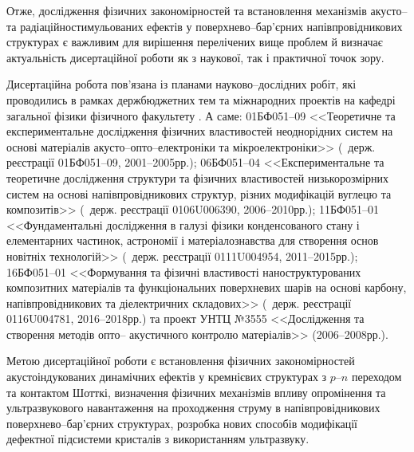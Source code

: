 Отже,  дослідження фізичних  закономірностей  та встановлення механізмів акусто-- та радіаційностимульованих
ефектів у поверхнево--бар'єрних напівпровідникових структурах  є  важливим  для  вирішення  перелічених  вище  проблем  й визначає актуальність дисертаційної роботи як з наукової, так і практичної точок зору.


{\InterconnectionTXT}
Дисертаційна робота  пов’язана із планами науково--дослідних робіт, які проводились в рамках
держбюджетних тем та міжнародних проектів на кафедрі загальної фізики фізичного факультету \thesisOfOrganization.
А саме:
\textnumero01БФ051--09 <<Теоретичне та експериментальне дослідження фізичних властивостей неоднорідних систем на основі матеріалів акусто--опто--електроніки та мікроелектроніки>>
(\textnumero~держ. реєстрації 01БФ051--09, 2001--2005рр.);
\textnumero06БФ051--04 <<Експериментальне та теоретичне дослідження структури та фізичних властивостей низькорозмірних систем на основі напівпровідникових структур, різних модифікацій вуглецю та композитів>>
(\textnumero~держ. реєстрації 0106U006390, 2006--2010рр.);
\textnumero11БФ051--01 <<Фундаментальні дослідження в галузі фізики конденсованого стану і елементарних частинок, астрономії і матеріалознавства для створення основ новітніх технологій>>
(\textnumero~держ. реєстрації 0111U004954, 2011--2015рр.);
\textnumero16БФ051--01 <<Формування та фізичні властивості наноструктурованих композитних матеріалів та функціональних поверхневих шарів на основі карбону, напівпровідникових та діелектричних складових>>
(\textnumero~держ. реєстрації  0116U004781, 2016--2018рр.) та
проект УНТЦ №3555 <<Дослідження та створення методів опто-- акустичного контролю матеріалів>> (2006--2008рр.).

{\AimAndTasksTXT}
Метою дисертаційної роботи є
встановлення фізичних закономірностей акустоіндукованих динамічних ефектів у кремнієвих структурах з $p$--$n$ переходом та контактом Шотткі,
визначення фізичних механізмів впливу опромінення та ультразвукового навантаження на проходження струму в напівпровідникових поверхнево--бар'єрних структурах,
 розробка нових способів модифікації дефектної підсистеми кристалів з використанням ультразвуку.

